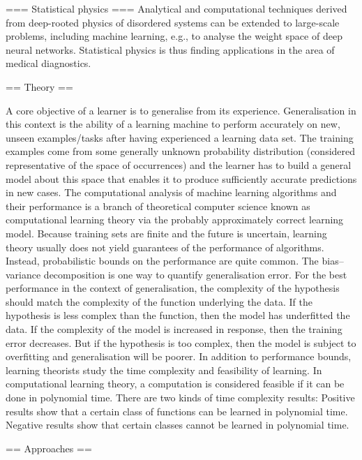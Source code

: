 === Statistical physics ===
Analytical and computational techniques derived from deep-rooted physics of disordered systems can be extended to large-scale problems, including machine learning, e.g., to analyse the weight space of deep neural networks. Statistical physics is thus finding applications in the area of medical diagnostics.


== Theory ==

A core objective of a learner is to generalise from its experience. Generalisation in this context is the ability of a learning machine to perform accurately on new, unseen examples/tasks after having experienced a learning data set. The training examples come from some generally unknown probability distribution (considered representative of the space of occurrences) and the learner has to build a general model about this space that enables it to produce sufficiently accurate predictions in new cases.
The computational analysis of machine learning algorithms and their performance is a branch of theoretical computer science known as computational learning theory via the probably approximately correct learning  model. Because training sets are finite and the future is uncertain, learning theory usually does not yield guarantees of the performance of algorithms. Instead, probabilistic bounds on the performance are quite common. The bias–variance decomposition is one way to quantify generalisation error.
For the best performance in the context of generalisation, the complexity of the hypothesis should match the complexity of the function underlying the data. If the hypothesis is less complex than the function, then the model has underfitted the data. If the complexity of the model is increased in response, then the training error decreases. But if the hypothesis is too complex, then the model is subject to overfitting and generalisation will be poorer.
In addition to performance bounds, learning theorists study the time complexity and feasibility of learning. In computational learning theory, a computation is considered feasible if it can be done in polynomial time. There are two kinds of time complexity results: Positive results show that a certain class of functions can be learned in polynomial time. Negative results show that certain classes cannot be learned in polynomial time.


== Approaches ==


